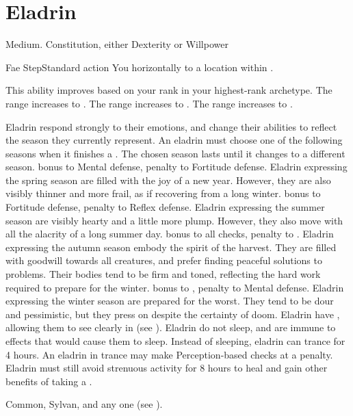 

\section{Eladrin}

   Medium.
    Constitution, either  Dexterity or  Willpower
  \begin{raggeditemize}
    \begin{magicalactiveability}{Fae Step}{Standard action}
        \rankline
        You  horizontally to a location within \shortrange.

        \rankline
        This ability improves based on your rank in your highest-rank archetype.
         The range increases to \medrange.
         The range increases to \longrange.
         The range increases to \distrange.
      \end{magicalactiveability}
     Eladrin respond strongly to their emotions, and change their abilities to reflect the season they currently represent.
      An eladrin must choose one of the following seasons when it finishes a .
      The chosen season lasts until it changes to a different season.
        bonus to Mental defense,  penalty to Fortitude defense.
      Eladrin expressing the spring season are filled with the joy of a new year.
      However, they are also visibly thinner and more frail, as if recovering from a long winter.
        bonus to Fortitude defense,  penalty to Reflex defense.
      Eladrin expressing the summer season are visibly hearty and a little more plump.
      However, they also move with all the alacrity of a long summer day.
        bonus to all checks,  penalty to .
      Eladrin expressing the autumn season embody the spirit of the harvest.
      They are filled with goodwill towards all creatures, and prefer finding peaceful solutions to problems.
      Their bodies tend to be firm and toned, reflecting the hard work required to prepare for the winter.
        bonus to ,  penalty to Mental defense.
      Eladrin expressing the winter season are prepared for the worst.
      They tend to be dour and pessimistic, but they press on despite the certainty of doom.
     Eladrin have , allowing them to see clearly in  (see ).
     Eladrin do not sleep, and are immune to \magical effects that would cause them to sleep.
      Instead of sleeping, eladrin can trance for 4 hours.
      An eladrin in trance may make Perception-based checks at a  penalty.
      Eladrin must still avoid strenuous activity for 8 hours to heal and gain other benefits of taking a .
  \end{raggeditemize}
   Common, Sylvan, and any one  (see ).

